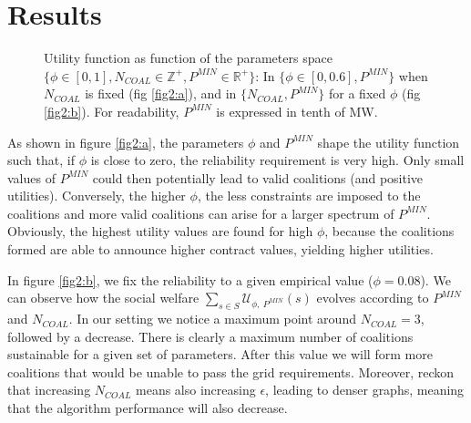 \documentclass[conference]{IEEEtran}
\begin{document}
\section{Results}
\label{sec:results}

\begin{figure}
 \centering
\caption{Utility function as function of the parameters space $\{\phi \in [0,1], N_{COAL}\in \mathbb{Z}^+, P^{MIN} \in \mathbb{R}^+\}$: In $ \{\phi \in [0,0.6], P^{MIN}\} $ when $ N_{COAL} $ is fixed (fig \ref{fig2:a}), and in $ \{N_{COAL}, P^{MIN}\} $ for a fixed $ \phi $ (fig \ref{fig2:b}). For readability, $ P^{MIN} $ is expressed in tenth of MW.}
\label{Fig2}
\end{figure}

As shown in figure \ref{fig2:a}, the parameters $\phi$ and $P^{MIN}$ shape the utility function such that, if $ \phi $ is close to zero, the reliability requirement is very high. Only small values of $ P^{MIN}$ could then potentially lead to valid coalitions (and positive utilities). Conversely, the higher $\phi$, the less constraints are imposed to the coalitions and more valid coalitions can arise for a larger spectrum of $ P^{MIN}$. Obviously, the highest utility values are found for high $ \phi $, because the coalitions formed are able to announce higher contract values, yielding higher utilities. 

In figure \ref{fig2:b}, we fix the reliability to a given empirical value ($\phi = 0.08 $). We can observe how the social welfare $\sum_{s \in S} \mathcal{U}_{\phi,\ P^{MIN}}(s)$ evolves according to $P^{MIN}$ and $ N_{COAL} $. In our setting we notice a maximum point around $ N_{COAL} = 3 $, followed by a decrease. There is clearly a maximum number of coalitions sustainable for a given set of parameters. After this value we will form more coalitions that would be unable to pass the grid requirements. Moreover, reckon that increasing $ N_{COAL} $ means also increasing $ \epsilon $, leading to denser graphs, meaning that the algorithm performance will also decrease.
\end{document}
